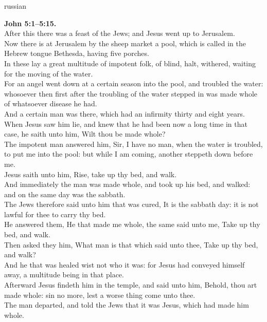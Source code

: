 \documentclass[10pt]{article} %
\begin{document}
{\begin{minipage}[t]{0.45\textwidth}
\begin{otherlanguage*}{russian}
\end{otherlanguage*}
\end{minipage}
\hfill
\begin{minipage}[t]{0.45\textwidth}

\textbf{John 5:1--5:15.}\\
After this there was a feast of the Jews; and Jesus went up to Jerusalem.\\
Now there is at Jerusalem by the sheep market a pool, which is called in the Hebrew tongue Bethesda, having five porches.\\
In these lay a great multitude of impotent folk, of blind, halt, withered, waiting for the moving of the water.\\
For an angel went down at a certain season into the pool, and troubled the water: whosoever then first after the troubling of the water stepped in was made whole of whatsoever disease he had.\\
And a certain man was there, which had an infirmity thirty and eight years.\\
When Jesus saw him lie, and knew that he had been now a long time in that case, he saith unto him, Wilt thou be made whole?\\
The impotent man answered him, Sir, I have no man, when the water is troubled, to put me into the pool: but while I am coming, another steppeth down before me.\\
Jesus saith unto him, Rise, take up thy bed, and walk.\\
And immediately the man was made whole, and took up his bed, and walked: and on the same day was the sabbath.\\
The Jews therefore said unto him that was cured, It is the sabbath day: it is not lawful for thee to carry thy bed.\\
He answered them, He that made me whole, the same said unto me, Take up thy bed, and walk.\\
Then asked they him, What man is that which said unto thee, Take up thy bed, and walk?\\
And he that was healed wist not who it was: for Jesus had conveyed himself away, a multitude being in that place.\\
Afterward Jesus findeth him in the temple, and said unto him, Behold, thou art made whole: sin no more, lest a worse thing come unto thee.\\
The man departed, and told the Jews that it was Jesus, which had made him whole.\\

\end{minipage}}
\end{document}
